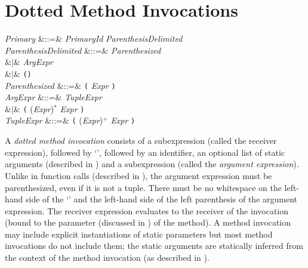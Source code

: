 %
%
%
%

\section{Dotted Method Invocations}


\begin{Grammar}
\emph{Primary}
&::=& \emph{Primary}\emph{Id}
 \emph{ParenthesisDelimited}\\

\emph{ParenthesisDelimited}
&::=& \emph{Parenthesized}\\
&$|$& \emph{ArgExpr}\\
&$|$& \texttt(\texttt)\\

\emph{Parenthesized} &::=& \texttt( \emph{Expr} \texttt)\\

\emph{ArgExpr}
&::=& \emph{TupleExpr}\\
&$|$& \texttt( (\emph{Expr}\EXP{,})$^*$ \emph{Expr} \texttt)\\

\emph{TupleExpr}
&::=& \texttt( (\emph{Expr}\EXP{,})$^+$ \emph{Expr} \texttt)\\

\end{Grammar}

A \emph{dotted method invocation} consists of a subexpression
(called the receiver expression), followed by `',
followed by an identifier, an optional list of static arguments
(described in )
and a subexpression (called the \emph{argument expression}).
Unlike in function calls (described in ),
the argument expression must be parenthesized, even if it is not a tuple.
There must be no whitespace on the left-hand side of the `' and
the left-hand side of the left parenthesis of the argument expression.
The receiver expression evaluates to the receiver of the invocation (bound
to the  parameter (discussed in ) of the method).
A method invocation may include explicit instantiations of static parameters
but most method invocations do not include them; the static arguments
are statically inferred from the context of the method invocation (as
described in ).

